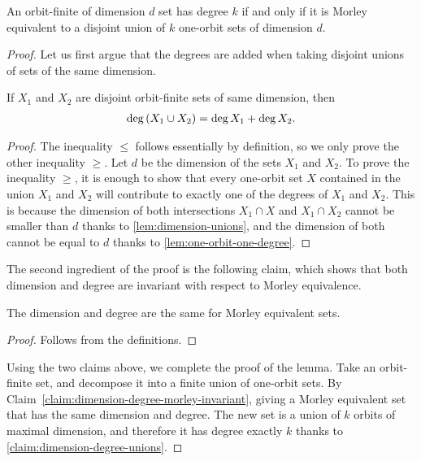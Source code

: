 \begin{lemma}\label{lem:signature-in-terms-of-orbits}
    An orbit-finite of dimension $d$ set has degree $k$ if and only if it is Morley equivalent to a disjoint union of $k$ one-orbit sets of dimension $d$.
\end{lemma}
\begin{proof}
    Let us first argue that the degrees are added when taking disjoint unions of sets of the same dimension. 

    \begin{claim}\label{claim:dimension-degree-unions}
        If $X_1$ and $X_2$ are disjoint orbit-finite sets of same dimension, then 
        \begin{align*}
        \operatorname{deg}{(X_1 \cup X_2)} = \operatorname{deg}{X_1} + \operatorname{deg}{X_2}.
        \end{align*}
    \end{claim}
    \begin{proof}
        The inequality $\leq$ follows essentially by definition, so we only prove the  other inequality $\geq$. Let $d$ be the dimension of the sets $X_1$ and $X_2$. To prove the inequality $\geq$, it is enough to show that every one-orbit set $X$ contained in the union $X_1$ and $X_2$ will contribute to exactly one of the degrees of $X_1$ and $X_2$. This is because the dimension of both intersections $X_1 \cap X$ and $X_1 \cap X_2$ cannot be smaller than $d$ thanks to \cref{lem:dimension-unions}, and the dimension of both cannot be equal to $d$ thanks to \cref{lem:one-orbit-one-degree}.
    \end{proof}

    The second ingredient of the proof is the following claim, which shows that both dimension and degree are invariant with respect to Morley equivalence. 
    \begin{claim}
        \label{claim:dimension-degree-morley-invariant}
        The dimension and degree are the same for Morley equivalent sets.
    \end{claim}
    \begin{proof}
        Follows from the definitions.
    \end{proof}

    Using the two claims above, we complete the proof of the lemma. Take an orbit-finite set, and decompose it into a finite union of one-orbit sets. By Claim~\ref{claim:dimension-degree-morley-invariant}, giving a Morley equivalent set that has the same  dimension and degree.  The new set is a union of $k$ orbits of maximal dimension, and therefore it has degree exactly $k$ thanks to \cref{claim:dimension-degree-unions}. 
\end{proof}






